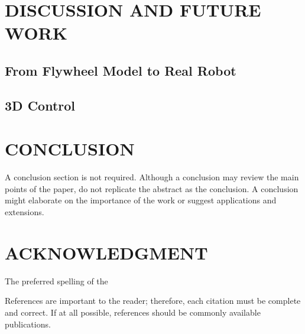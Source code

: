 \documentclass[letterpaper, 10 pt, conference]{ieeeconf}  %
\begin{document}
\section{DISCUSSION AND FUTURE WORK}
\subsection{From Flywheel Model to Real Robot}
\subsection{3D Control}

\section{CONCLUSION}

A conclusion section is not required. Although a conclusion may review the main points of the paper, do not replicate the abstract as the conclusion. A conclusion might elaborate on the importance of the work or suggest applications and extensions. 

\addtolength{\textheight}{-12cm}   %








\section*{ACKNOWLEDGMENT}

The preferred spelling of the



References are important to the reader; therefore, each citation must be complete and correct. If at all possible, references should be commonly available publications.




\end{document}
